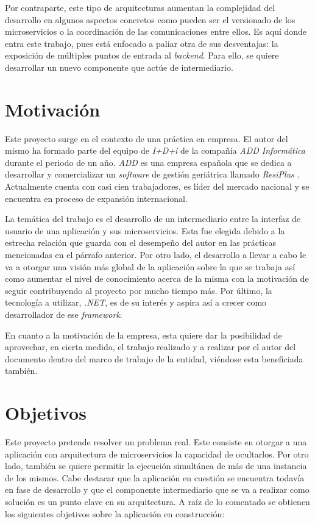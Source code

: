\documentclass[11pt,spanish,listoffigures]{tfgetsinf}
\begin{document}
Por contraparte, este tipo de arquitecturas aumentan la complejidad del desarrollo en algunos aspectos concretos como pueden ser el versionado de los microservicios o la coordinación de las comunicaciones entre ellos. Es aquí donde entra este trabajo, pues está enfocado a paliar otra de sus desventajas: la exposición de múltiples puntos de entrada al \emph{backend}. Para ello, se quiere desarrollar un nuevo componente que actúe de intermediario.

\section{Motivación}

Este proyecto surge en el contexto de una práctica en empresa. El autor del mismo ha formado parte del equipo de \emph{I+D+i} de la compañía \emph{ADD Informática} durante el periodo de un año. \emph{ADD} es una empresa española que se dedica a desarrollar y comercializar un \emph{software} de gestión geriátrica llamado \emph{ResiPlus} \cite{ResiPlus}. Actualmente cuenta con casi cien trabajadores, es líder del mercado nacional y se encuentra en proceso de expansión internacional.

La temática del trabajo es el desarrollo de un intermediario entre la interfaz de usuario de una aplicación y sus microservicios. Esta fue elegida debido a la estrecha relación que guarda con el desempeño del autor en las prácticas mencionadas en el párrafo anterior. Por otro lado, el desarrollo a llevar a cabo le va a otorgar una visión más global de la aplicación sobre la que se trabaja así como aumentar el nivel de conocimiento acerca de la misma con la motivación de seguir contribuyendo al proyecto por mucho tiempo más. Por último, la tecnología a utilizar, \emph{.NET}, es de su interés y aspira así a crecer como desarrollador de ese \emph{framework}.

En cuanto a la motivación de la empresa, esta quiere dar la posibilidad de aprovechar, en cierta medida, el trabajo realizado y a realizar por el autor del documento dentro del marco de trabajo de la entidad, viéndose esta beneficiada también.

\section{Objetivos}

Este proyecto pretende resolver un problema real. Este consiste en otorgar a una aplicación con arquitectura de microservicios la capacidad de ocultarlos. Por otro lado, también se quiere permitir la ejecución simultánea de más de una instancia de los mismos. Cabe destacar que la aplicación en cuestión se encuentra todavía en fase de desarrollo y que el componente intermediario que se va a realizar como solución es un punto clave en su arquitectura. A raíz de lo comentado se obtienen los siguientes objetivos sobre la aplicación en construcción:
\end{document}
